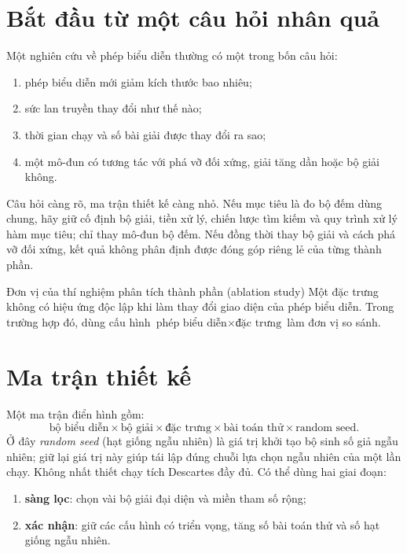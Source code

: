 \section{Bắt đầu từ một câu hỏi nhân quả}

Một nghiên cứu về phép biểu diễn thường có một trong bốn câu hỏi:
\begin{enumerate}
  \item phép biểu diễn mới giảm kích thước bao nhiêu;
  \item sức lan truyền thay đổi như thế nào;
  \item thời gian chạy và số bài giải được thay đổi ra sao;
  \item một mô-đun có tương tác với phá vỡ đối xứng, giải tăng dần hoặc bộ giải không.
\end{enumerate}

Câu hỏi càng rõ, ma trận thiết kế càng nhỏ. Nếu mục tiêu là đo bộ đếm dùng
chung, hãy giữ cố định bộ giải, tiền xử lý, chiến lược tìm kiếm và quy trình
xử lý hàm mục tiêu; chỉ thay mô-đun bộ đếm. Nếu đồng thời thay bộ giải và cách
phá vỡ đối xứng, kết quả không phân định được đóng góp riêng lẻ của từng thành phần.

\begin{designrule}{Đơn vị của thí nghiệm phân tích thành phần (ablation study)}
Một đặc trưng không có hiệu ứng độc lập khi làm thay đổi giao diện của phép biểu diễn.
Trong trường hợp đó, dùng cấu hình
\(\text{phép biểu diễn}\times\text{đặc trưng}\) làm đơn vị so sánh.
\end{designrule}

\section{Ma trận thiết kế}

Một ma trận điển hình gồm:
\[
  \text{bộ biểu diễn}
  \times
  \text{bộ giải}
  \times
  \text{đặc trưng}
  \times
  \text{bài toán thử}
  \times
  \text{random seed}.
\]
Ở đây \emph{random seed} (hạt giống ngẫu nhiên) là giá trị khởi tạo bộ sinh
số giả ngẫu nhiên; giữ lại giá trị này giúp tái lập đúng chuỗi lựa chọn ngẫu
nhiên của một lần chạy.
Không nhất thiết chạy tích Descartes đầy đủ. Có thể dùng hai giai đoạn:
\begin{enumerate}
  \item \textbf{sàng lọc}: chọn vài bộ giải đại diện và miền tham số rộng;
  \item \textbf{xác nhận}: giữ các cấu hình có triển vọng, tăng số bài toán
        thử và số hạt giống ngẫu nhiên.
\end{enumerate}

